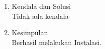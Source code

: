 
\begin{enumerate}
\item Kendala dan Solusi
\\ Tidak ada kendala

\item Kesimpulan
\\ Berhasil melakukan Instalasi.

\end{enumerate}